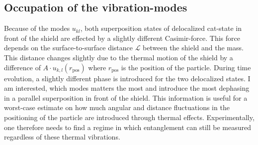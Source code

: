 \subsection{Occupation of the vibration-modes}
Because of the modes $u_{kl}$, both superposition states of delocalized cat-state in front of the shield are effected by a slightly different Casimir-force. This force depends on the surface-to-surface distance $\mathscr{L}$ between the shield and the mass.
This distance changes slightly due to the thermal motion of the shield by a difference of $A \cdot u_{k,l}(r_\mathrm{pos})$ where $r_\mathrm{pos}$ is the position of the particle. 
During time evolution, a slightly different phase is introduced for the two delocalized states. 
I am interested, which modes matters the most and introduce the most dephasing in a parallel superposition in front of the shield. This information is useful for a worst-case estimate on how much angular and distance fluctuations in the positioning of the particle are introduced through thermal effects. 
Experimentally, one therefore needs to find a regime in which entanglement can still be measured regardless of these thermal vibrations.

